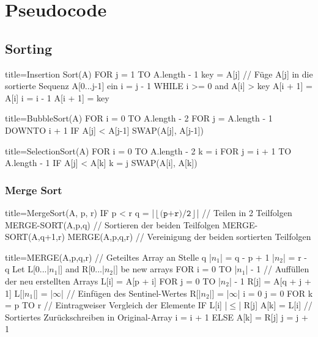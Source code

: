 \section*{Pseudocode}
\subsection*{Sorting}
    \begin{ccode}[autogobble]{title=Insertion Sort(A)}  
        FOR j = 1 TO A.length - 1
          key = A[j]
          // Füge A[j] in die sortierte Sequenz A[0...j-1] ein
          i = j - 1
          WHILE i >= 0 and A[i] > key
              A[i + 1] = A[i]
              i = i - 1
          A[i + 1] = key
    \end{ccode}

    \begin{ccode}[autogobble]{title=BubbleSort(A)}  
        FOR i = 0 TO A.length - 2
            FOR j = A.length - 1 DOWNTO i + 1
                IF A[j] < A[j-1]
                    SWAP(A[j], A[j-1])
        \end{ccode}
    
        \begin{ccode}[autogobble]{title=SelectionSort(A)}
        FOR i = 0 TO A.length - 2
            k = i 
            FOR j = i + 1 TO A.length - 1
                IF A[j] < A[k]
                    k = j 
            SWAP(A[i], A[k])
        \end{ccode}
    
    \subsubsection*{Merge Sort}
        \begin{ccode}[autogobble,escapeinside=||]{title={MergeSort(A, p, r)}}
        IF p < r
            q = |$\left \lfloor \texttt{(p+r)/2} \right \rfloor$| // Teilen in 2 Teilfolgen 
            MERGE-SORT(A,p,q) // Sortieren der beiden Teilfolgen
            MERGE-SORT(A,q+1,r)
            MERGE(A,p,q,r) // Vereinigung der beiden sortierten Teilfolgen
        \end{ccode}
    
        \begin{ccode}[autogobble,escapeinside=||]{title={MERGE(A,p,q,r)}}
        // Geteiltes Array an Stelle q
        |$n_1$| = q - p + 1
        |$n_2$| = r - q 
        Let L[0...|$n_1$|] and R[0...|$n_2$|] be new arrays 
        FOR i = 0 TO |$n_1$| - 1 // Auffüllen der neu erstellten Arrays
            L[i] = A[p + i]
        FOR j = 0 TO |$n_2$| - 1
            R[j] = A[q + j + 1]
        L[|$n_1$|] = |$\infty$| // Einfügen des Sentinel-Wertes
        R[|$n_2$|] = |$\infty$|
        i = 0
        j = 0
        FOR k = p TO r  // Eintragweiser Vergleich der Elemente          
            IF L[i] |$\leq$| R[j]
                A[k] = L[i] // Sortiertes Zurückschreiben in Original-Array
                i = i + 1
            ELSE 
                A[k] = R[j]
                j = j + 1
        \end{ccode}
    
